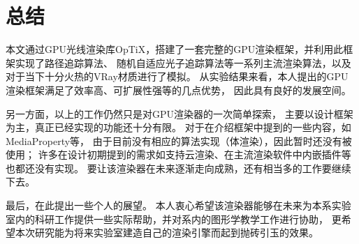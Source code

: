 \chapter{总结}
\label{cha:summarization}

本文通过GPU光线渲染库OpTiX，搭建了一套完整的GPU渲染框架，并利用此框架实现了路径追踪算法、
随机自适应光子追踪算法等一系列主流渲染算法，以及对于当下十分火热的VRay材质进行了模拟。
从实验结果来看，本人提出的GPU渲染框架满足了效率高、可扩展性强等的几点优势，
因此具有良好的发展空间。

另一方面，以上的工作仍然只是对GPU渲染器的一次简单探索，
主要以设计框架为主，真正已经实现的功能还十分有限。
对于在介绍框架中提到的一些内容，如MediaProperty等，
由于目前没有相应的算法实现（体渲染），因此暂时还没有被使用；
许多在设计初期提到的需求如支持云渲染、在主流渲染软件中内嵌插件等也都还没有实现。
要让该渲染器在未来逐渐走向成熟，还有相当多的工作要继续下去。

最后，在此提出一些个人的展望。
本人衷心希望该渲染器能够在未来为本系实验室内的科研工作提供一些实际帮助，并对系内的图形学教学工作进行协助，
更希望本次研究能为将来实验室建造自己的渲染引擎而起到抛砖引玉的效果。




